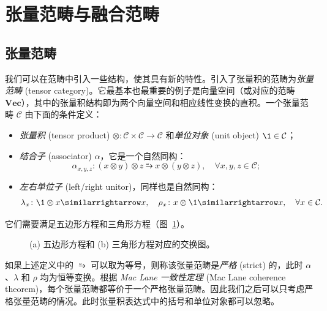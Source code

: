 \section{张量范畴与融合范畴}
\label{sec:tensor-category-fusion-category}

\subsection{张量范畴}

我们可以在范畴中引入一些结构，使其具有新的特性。引入了张量积的范畴为\emph{张量范畴} (tensor category)\cite{bakalov2001lectures,muger2008tensor,maclane2013categories,beer2018categories,kong2022invitation}。它最基本也最重要的例子是向量空间（或对应的范畴 $\mathbf{Vec}$），其中的张量积结构即为两个向量空间和相应线性变换的直积。一个张量范畴 $\mathcal{C}$ 由下面的条件定义：
\begin{itemize}
  \item \emph{张量积} (tensor product) $\otimes\colon\mathcal{C}\times\mathcal{C}\to\mathcal{C}$ 和\emph{单位对象} (unit object) $\1\in\mathcal{C}$；
  \item \emph{结合子} (associator) $\alpha$，它是一个自然同构：
    \begin{equation}
      \alpha_{x,y,z} \colon (x\otimes y)\otimes z \similarrightarrow x\otimes(y\otimes z), \quad \forall x,y,z \in \mathcal{C};
    \end{equation}
  \item \emph{左右单位子} (left/right unitor)，同样也是自然同构：
    \begin{equation}
      \lambda_x \colon \1\otimes x \similarrightarrow x, \quad
      \rho_x    \colon x\otimes\1  \similarrightarrow x, \quad
      \forall x \in \mathcal{C}.
    \end{equation}
\end{itemize}
它们需要满足五边形方程和三角形方程（图~\ref{fig:pentagon-triangle-equation}）。

\begin{figure}[htb]
  \centering
   \quad
  \caption[五边形方程和三角形方程对应的交换图]{(a) 五边形方程和 (b) 三角形方程对应的交换图。}
  \label{fig:pentagon-triangle-equation}
\end{figure}

如果上述定义中的 $\similarrightarrow$ 可以取为等号，则称该张量范畴是\emph{严格} (strict) 的，此时 $\alpha$、$\lambda$ 和 $\rho$ 均为恒等变换。根据 \emph{Mac Lane 一致性定理} (Mac Lane coherence theorem)，每个张量范畴都等价于一个严格张量范畴\cite{maclane2013categories}。因此我们之后可以只考虑严格张量范畴的情况。此时张量积表达式中的括号和单位对象都可以忽略。

